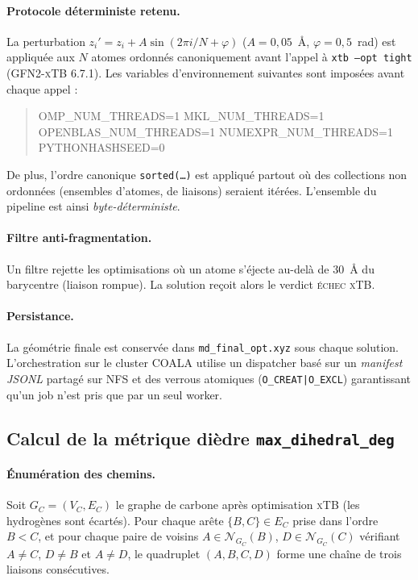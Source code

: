 \documentclass[11pt,a4paper]{article}
\newcommand{\xtb}{\textsc{xTB}}
\begin{document}
\paragraph{Protocole déterministe retenu.}
La perturbation $z_i' = z_i + A\sin(2\pi i/N + \varphi)$ ($A=0{,}05$~\AA,
$\varphi=0{,}5$~rad) est appliquée aux $N$ atomes ordonnés
canoniquement avant l'appel à \texttt{xtb --opt tight}
(GFN2-\xtb{} 6.7.1). Les variables d'environnement suivantes sont
imposées avant chaque appel :
\begin{quote}\small\ttfamily
OMP\_NUM\_THREADS=1 \quad MKL\_NUM\_THREADS=1 \\
OPENBLAS\_NUM\_THREADS=1 \quad NUMEXPR\_NUM\_THREADS=1 \\
PYTHONHASHSEED=0
\end{quote}
De plus, l'ordre canonique \texttt{sorted(\dots)} est appliqué partout
où des collections non ordonnées (ensembles d'atomes, de liaisons)
seraient itérées. L'ensemble du pipeline est ainsi
\emph{byte-déterministe}.

\paragraph{Filtre anti-fragmentation.}
Un filtre rejette les optimisations où un atome s'éjecte au-delà de
$30$~\AA{} du barycentre (liaison rompue). La solution reçoit alors le
verdict \textsc{échec \xtb{}}.

\paragraph{Persistance.}
La géométrie finale est conservée dans \texttt{md\_final\_opt.xyz} sous
chaque solution. L'orchestration sur le cluster COALA utilise un
dispatcher basé sur un \emph{manifest JSONL} partagé sur NFS et des
verrous atomiques (\texttt{O\_CREAT|O\_EXCL}) garantissant qu'un job
n'est pris que par un seul worker.

\subsection{Calcul de la métrique dièdre \texttt{max\_dihedral\_deg}}
\label{app:dihedral}

\paragraph{Énumération des chemins.}
Soit $G_C = (V_C, E_C)$ le graphe de carbone après optimisation \xtb{}
(les hydrogènes sont écartés). Pour chaque arête $\{B,C\} \in E_C$
prise dans l'ordre $B < C$, et pour chaque paire de voisins
$A \in \mathcal{N}_{G_C}(B)$, $D \in \mathcal{N}_{G_C}(C)$ vérifiant
$A \ne C$, $D \ne B$ et $A \ne D$, le quadruplet $(A,B,C,D)$ forme
une chaîne de trois liaisons consécutives.
\end{document}

